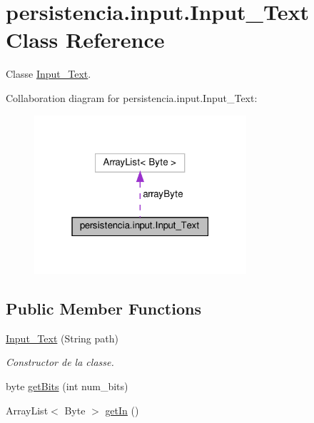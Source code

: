 \hypertarget{classpersistencia_1_1input_1_1Input__Text}{}\section{persistencia.\+input.\+Input\+\_\+\+Text Class Reference}
\label{classpersistencia_1_1input_1_1Input__Text}


Classe \hyperlink{classpersistencia_1_1input_1_1Input__Text}{Input\+\_\+\+Text}.  




Collaboration diagram for persistencia.\+input.\+Input\+\_\+\+Text\+:
\nopagebreak
\begin{figure}[H]
\begin{center}
\leavevmode
\includegraphics[width=223pt]{classpersistencia_1_1input_1_1Input__Text__coll__graph}
\end{center}
\end{figure}
\subsection*{Public Member Functions}
\begin{DoxyCompactItemize}
\item 
\hyperlink{classpersistencia_1_1input_1_1Input__Text_a9027dd15a85630115b38369358defd04}{Input\+\_\+\+Text} (String path)
\begin{DoxyCompactList}\small\item\em Constructor de la classe. \end{DoxyCompactList}\item 
byte \hyperlink{classpersistencia_1_1input_1_1Input__Text_a471f357f566d79f224a9cc51967f34ef}{get\+Bits} (int num\+\_\+bits)
\item 
Array\+List$<$ Byte $>$ \hyperlink{classpersistencia_1_1input_1_1Input__Text_a36c0224f7ac8f3a60a80bacc571dd3be}{get\+In} ()
\end{DoxyCompactItemize}


